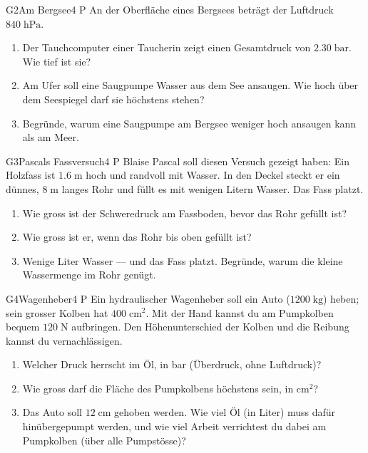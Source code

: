 \documentclass[11pt]{article}
\begin{document}

\begin{lpaufgabe}{G2}{Am Bergsee}{4 P}
An der Oberfläche eines Bergsees beträgt der Luftdruck \(840\;\text{hPa}\).
\begin{enumerate}[label=\alph*),leftmargin=*,itemsep=2pt,topsep=2pt]
\item Der Tauchcomputer einer Taucherin zeigt einen Gesamtdruck von \(2.30\;\text{bar}\). Wie tief ist sie?
\item Am Ufer soll eine Saugpumpe Wasser aus dem See ansaugen. Wie hoch über dem Seespiegel darf sie höchstens stehen?
\item Begründe, warum eine Saugpumpe am Bergsee weniger hoch ansaugen kann als am Meer.
\end{enumerate}
\end{lpaufgabe}

\begin{lpaufgabe}{G3}{Pascals Fassversuch}{4 P}
Blaise Pascal soll diesen Versuch gezeigt haben: Ein Holzfass ist \(1.6\;\text{m}\) hoch und randvoll mit Wasser. In den Deckel steckt er ein dünnes, \(8\;\text{m}\) langes Rohr und füllt es mit wenigen Litern Wasser. Das Fass platzt.
\begin{enumerate}[label=\alph*),leftmargin=*,itemsep=2pt,topsep=2pt]
\item Wie gross ist der Schweredruck am Fassboden, bevor das Rohr gefüllt ist?
\item Wie gross ist er, wenn das Rohr bis oben gefüllt ist?
\item Wenige Liter Wasser — und das Fass platzt. Begründe, warum die kleine Wassermenge im Rohr genügt.
\end{enumerate}
\end{lpaufgabe}


\begin{lpaufgabe}{G4}{Wagenheber}{4 P}
Ein hydraulischer Wagenheber soll ein Auto (\(1200\;\text{kg}\)) heben; sein grosser Kolben hat \(400\;\text{cm}^2\). Mit der Hand kannst du am Pumpkolben bequem \(120\;\text{N}\) aufbringen. Den Höhenunterschied der Kolben und die Reibung kannst du vernachlässigen.
\begin{enumerate}[label=\alph*),leftmargin=*,itemsep=2pt,topsep=2pt]
\item Welcher Druck herrscht im Öl, in bar (Überdruck, ohne Luftdruck)?
\item Wie gross darf die Fläche des Pumpkolbens höchstens sein, in \(\text{cm}^2\)?
\item Das Auto soll \(12\;\text{cm}\) gehoben werden. Wie viel Öl (in Liter) muss dafür hinübergepumpt werden, und wie viel Arbeit verrichtest du dabei am Pumpkolben (über alle Pumpstösse)?
\end{enumerate}
\end{lpaufgabe}
\end{document}
